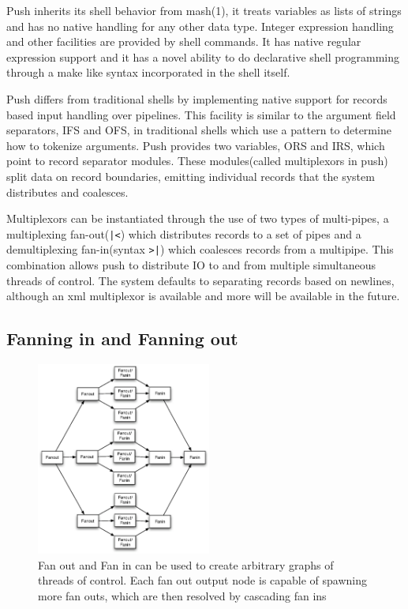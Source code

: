 \documentclass[10pt,conference,letterpaper]{IEEEtran}
\begin{document}
Push inherits its shell behavior from mash(1), it treats variables as lists of strings and has no native handling for any other data type. Integer expression handling and other facilities are provided by shell commands. It has native regular expression support and it has a novel ability to do declarative shell programming through a make like syntax incorporated in the shell itself.

Push differs from traditional shells by implementing native support for records based input handling over pipelines. This facility is similar to the argument field separators, IFS and OFS, in traditional shells which use a pattern to determine how to tokenize arguments. Push provides two variables, ORS and IRS, which point to record separator modules. These modules(called multiplexors in push) split data on record boundaries,  emitting individual records that the system distributes and coalesces. 

Multiplexors can be instantiated through the use of two types of multi-pipes, a multiplexing fan-out(\verb!|<!)  which distributes records to a set of pipes and a demultiplexing fan-in(syntax \verb!>|!) which coalesces records from a multipipe. This combination allows push to distribute IO to and from multiple simultaneous threads of control. The system defaults to separating records based on newlines, although an xml multiplexor is available and more will be available in the future. 
\subsection{Fanning in and Fanning out}

\begin{figure}[htp]
\centering
\includegraphics[height=2.5in]{fofigraph.eps}
\caption{Fan out and Fan in can be used to create arbitrary graphs of threads of control. Each fan out output node is capable of spawning more fan outs, which are then resolved by cascading fan ins}\label{fig:fofigraph}
\end{figure}
\end{document}
